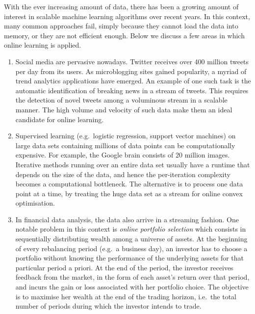 With the ever increasing amount of data, there has been a growing amount of interest in scalable machine learning algorithms over recent years. In this context, many common approaches fail, simply because they cannot load the data into memory, or they are not efficient enough. Below we discuss a few areas in which online learning is applied.
\begin{enumerate}
	\item Social media are pervasive nowadays. Twitter receives over 400 million tweets per day from its users. As microblogging sites gained popularity, a myriad of trend analytics applications have emerged. An example of one such task is the automatic identification of breaking news in a stream of tweets. This requires the detection of novel tweets among a voluminous stream in a scalable manner. The high volume and velocity of such data make them an ideal candidate
for online learning.

	\item Supervised learning (e.g.\ logistic regression, support vector machines) on large data sets containing millions of data points can be computationally expensive. For example, the Google brain consists of 20 million images. Iterative methods running over an entire data set usually have a runtime that depends on the size of the data, and hence the per-iteration complexity becomes a computational bottleneck. The alternative is to process one data point at a time, by treating the
huge data set as a stream for online convex optimisation.%

	\item In financial data analysis, the data also arrive in a streaming fashion. One notable problem in this context is \emph{online portfolio selection} which consists in sequentially distributing wealth among a universe of assets. At the beginning of every rebalancing period (e.g.\ a business day), an investor has to choose a portfolio without knowing the performance of the underlying assets for that particular period a priori. At the end of the period, the investor receives feedback from the market, in the form of each asset's return over that period, and incurs the gain or loss associated with her portfolio choice. The objective is to maximise her wealth at the end of the trading horizon, i.e.\ the total number of periods during which the investor intends to trade.
\end{enumerate}

